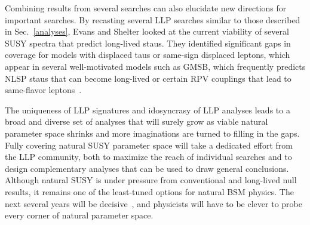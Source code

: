 \documentclass[12pt]{article}
\begin{document}
    Combining results from several searches can also elucidate new directions for important searches. By recasting several LLP searches similar to those described in Sec.~\ref{analyses}, Evans and Shelter looked at the current viability of several SUSY spectra that predict long-lived staus. They identified significant gaps in coverage for models with displaced taus or same-sign displaced leptons, which appear in several well-motivated models such as GMSB, which frequently predicts NLSP staus that can become long-lived or certain RPV couplings that lead to same-flavor leptons~\cite{ll_staus}. 

    The uniqueness of LLP signatures and idosyncrasy of LLP analyses leads to a broad and diverse set of analyses that will surely grow as viable natural parameter space shrinks and more imaginations are turned to filling in the gaps. Fully covering natural SUSY parameter space will take a dedicated effort from the LLP community, both to maximize the reach of individual searches and to design complementary analyses that can be used to draw general conclusions. Although natural SUSY is under pressure from conventional and long-lived null results, it remains one of the least-tuned options for natural BSM physics. The next several years will be decisive~\cite{cornering}, and physicists will have to be clever to probe every corner of natural parameter space.

\clearpage
\pagebreak
\singlespacing
{}

\end{document}
